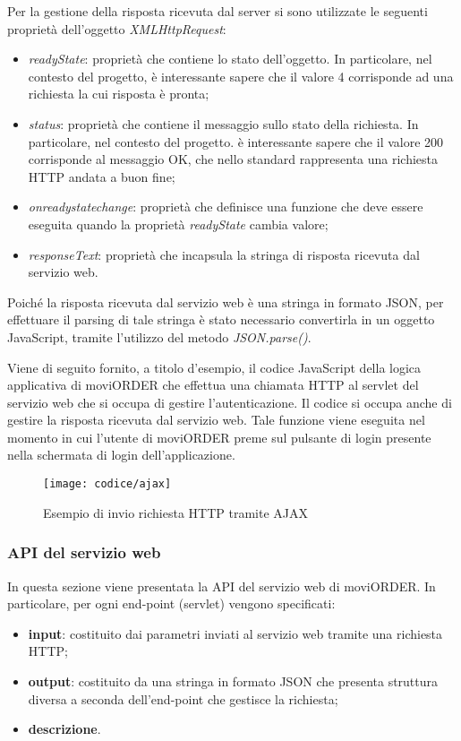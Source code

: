 Per la gestione della risposta ricevuta dal server si sono utilizzate le seguenti proprietà dell'oggetto \textit{XMLHttpRequest}:
\begin{itemize}
	\item \textit{readyState}: proprietà che contiene lo stato dell'oggetto. In particolare, nel contesto del progetto, è interessante sapere che il valore 4 corrisponde ad una richiesta la cui risposta è pronta;
	\item  \textit{status}: proprietà che contiene il messaggio sullo stato della richiesta. In particolare, nel contesto del progetto. è interessante sapere che il valore 200 corrisponde al messaggio OK, che nello standard rappresenta una richiesta HTTP andata a buon fine;
	\item \textit{onreadystatechange}: proprietà che definisce una funzione che deve essere eseguita quando la proprietà \textit{readyState} cambia valore;
	\item \textit{responseText}: proprietà che incapsula la stringa di risposta ricevuta dal servizio web. 
\end{itemize} 
Poiché la risposta ricevuta dal servizio web è una stringa in formato JSON, per effettuare il parsing di tale stringa è stato necessario convertirla in un oggetto JavaScript, tramite l'utilizzo del metodo \textit{JSON.parse()}.

Viene di seguito fornito, a titolo d'esempio, il codice JavaScript della logica applicativa di moviORDER che effettua una chiamata HTTP al servlet del servizio web che si occupa di gestire l'autenticazione. Il codice si occupa anche di gestire la risposta ricevuta dal servizio web. Tale funzione viene eseguita nel momento in cui l'utente di moviORDER preme sul pulsante di login presente nella schermata di login dell'applicazione.

\newpage

\begin{figure}[!h] 
    \centering 
    \texttt{[image: codice/ajax]} 
    \caption{Esempio di invio richiesta HTTP tramite AJAX}
\end{figure}

\subsubsection{API del servizio web} \label{api}

In questa sezione viene presentata la API del servizio web di moviORDER. In particolare, per ogni end-point (servlet) vengono specificati:
\begin{itemize}
	\item \textbf{input}: costituito dai parametri inviati al servizio web tramite una richiesta HTTP;
	\item \textbf{output}: costituito da una stringa in formato JSON che presenta struttura diversa a seconda dell'end-point che gestisce la richiesta;
	\item \textbf{descrizione}.
\end{itemize}

